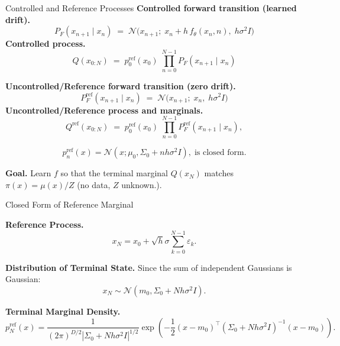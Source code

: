 \documentclass[aspectratio=169,xcolor=dvipsnames]{beamer}
\begin{document}
\begin{frame}[t]{Controlled and Reference Processes}
\scriptsize
\textbf{Controlled forward transition (learned drift).}
\[
P_F(x_{n+1}\mid x_n)\;=\;\mathcal N\!\big(x_{n+1};\;x_n + h\,f_\theta(x_n,n),\;h\sigma^2 I\big)
\]
\textbf{Controlled process.}
\[
Q(x_{0:N})\;=\;p^{\text{ref}}_0(x_0)\;\prod_{n=0}^{N-1} P_F(x_{n+1}\mid x_n)
\]

\medskip
\textbf{Uncontrolled/Reference forward transition (zero drift).}
\[
P_F^{\text{ref}}(x_{n+1}\mid x_n)\;=\;\mathcal N\!\big(x_{n+1};\;x_n,\;h\sigma^2 I\big)
\]
\textbf{Uncontrolled/Reference process and marginals.}
\[
Q^{\text{ref}}(x_{0:N})\;=\;p^{\text{ref}}_0(x_0)\;\prod_{n=0}^{N-1} P_F^{\text{ref}}(x_{n+1}\mid x_n),
\]

\[
p^{\text{ref}}_n(x) = \mathcal{N}\left( x; \mu_0, \Sigma_0 + n h \sigma^2 I \right), \;\text{is closed form.}
\]

\medskip
\textbf{Goal.} Learn $f$ so that the terminal marginal $Q(x_N)$ matches $\pi(x)=\mu(x)/Z$ (no data, $Z$ unknown.).


\end{frame}

\begin{frame}{Closed Form of Reference Marginal}
\footnotesize

\textbf{Reference Process.}
\[
x_N = x_0 + \sqrt{h} \sigma \sum_{k=0}^{N-1} \varepsilon_k.
\]

\textbf{Distribution of Terminal State.} Since the sum of independent Gaussians is Gaussian:
\[
x_N \sim \mathcal{N}(m_0, \Sigma_0 + N h \sigma^2 I).
\]

\textbf{Terminal Marginal Density.}
\[
p^{\text{ref}}_N(x) = \frac{1}{(2\pi)^{D/2} |\Sigma_0 + N h \sigma^2 I|^{1/2}} \exp\left( -\frac{1}{2} (x - m_0)^\top (\Sigma_0 + N h \sigma^2 I)^{-1} (x - m_0) \right).
\]

\end{frame}
\end{document}
